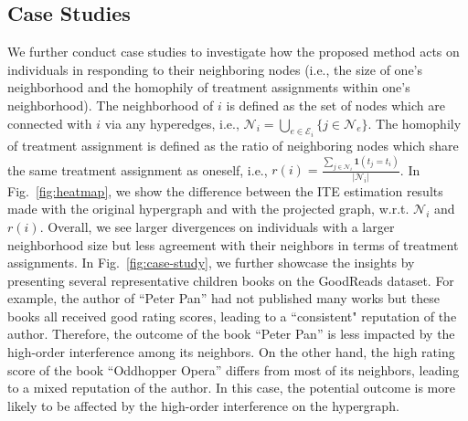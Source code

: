 \subsection{Case Studies}
We further conduct case studies to investigate how the proposed method acts on individuals in responding to their neighboring nodes (i.e., the size of one's neighborhood and the homophily of treatment assignments within one's neighborhood). The neighborhood of $i$ is defined as the set of nodes which are connected with $i$ via any hyperedges, i.e., $\mathcal{N}_i=\bigcup_{e\in\mathcal{E}_i}\{j\in\mathcal{N}_e\}$. The homophily of treatment assignment is defined as the ratio of neighboring nodes which share the same treatment assignment as oneself, i.e., $r(i)=\frac{\sum_{j\in \mathcal{N}_i}\mathbf{1}(t_j=t_i)}{|\mathcal{N}_i|}$. In Fig.~\ref{fig:heatmap}, we show the difference between the ITE estimation results made %
with the original hypergraph and with the projected graph, w.r.t. $\mathcal{N}_i$ and $r(i)$. Overall, we see larger divergences on individuals with a larger neighborhood size but less agreement with their neighbors in terms of treatment assignments. 
In Fig.~\ref{fig:case-study}, we further showcase the insights by presenting several representative children books on the GoodReads dataset. For example, the author of ``Peter Pan'' had not published many works but these books all received good rating scores, leading to a ``consistent" reputation of the author. Therefore, the outcome of the book ``Peter Pan'' is less impacted by the high-order interference among its neighbors. 
On the other hand, the high rating score of the book ``Oddhopper Opera'' differs from most of its neighbors, leading to a mixed reputation of the author. In this case, the potential outcome is more likely to be affected by the high-order interference on the hypergraph.


